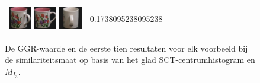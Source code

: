 \begin{figure}[!bp]
\begin{tabular}{m{11cm} | m{3cm} |}
\includegraphics[width=1cm]{coil/beeld-10.eps}
\includegraphics[width=1cm]{coil/beeld-6.eps}
\includegraphics[width=1cm]{coil/beeld-41.eps}
& {\scriptsize 0.1738095238095238}
\\
\end{tabular}
\vspace{5pt}
\caption{\label{fig:results_sct_glad_centrum_histgeb}De GGR-waarde en de eerste tien resultaten voor elk 
voorbeeld bij de similariteitsmaat op basis van het glad SCT-centrumhistogram en $M_{I_3}$.}
\end{figure}